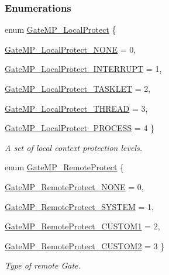 \subsubsection*{Enumerations}
\begin{DoxyCompactItemize}
\item 
enum \hyperlink{_gate_m_p_8h_a3877bd64627d7449d3687e8b06939652}{GateMP\_\-LocalProtect} \{ \par
\hyperlink{_gate_m_p_8h_a3877bd64627d7449d3687e8b06939652a4577e1162c081ed8019a349318ab3afe}{GateMP\_\-LocalProtect\_\-NONE} =  0, 
\par
\hyperlink{_gate_m_p_8h_a3877bd64627d7449d3687e8b06939652aa4c5dba40613d5436adb6c604bb8514f}{GateMP\_\-LocalProtect\_\-INTERRUPT} =  1, 
\par
\hyperlink{_gate_m_p_8h_a3877bd64627d7449d3687e8b06939652aabb3d9eb4b679ceebb537775d388f2b1}{GateMP\_\-LocalProtect\_\-TASKLET} =  2, 
\par
\hyperlink{_gate_m_p_8h_a3877bd64627d7449d3687e8b06939652a257bc8d4b8d6d19bdbe96cae37cbd908}{GateMP\_\-LocalProtect\_\-THREAD} =  3, 
\par
\hyperlink{_gate_m_p_8h_a3877bd64627d7449d3687e8b06939652aeec868d37052043812bc4c1829319a6d}{GateMP\_\-LocalProtect\_\-PROCESS} =  4
 \}
\begin{DoxyCompactList}\small\item\em A set of local context protection levels. \item\end{DoxyCompactList}\item 
enum \hyperlink{_gate_m_p_8h_a88716d5706d8fa8c6a3b9a4f023ef1d8}{GateMP\_\-RemoteProtect} \{ \par
\hyperlink{_gate_m_p_8h_a88716d5706d8fa8c6a3b9a4f023ef1d8a29b87b5258dbf5e387fc5a4ada3548ab}{GateMP\_\-RemoteProtect\_\-NONE} =  0, 
\par
\hyperlink{_gate_m_p_8h_a88716d5706d8fa8c6a3b9a4f023ef1d8aba4e153ee33cce1d32dc84254261c557}{GateMP\_\-RemoteProtect\_\-SYSTEM} =  1, 
\par
\hyperlink{_gate_m_p_8h_a88716d5706d8fa8c6a3b9a4f023ef1d8a2c1243e212dfe1dfce672b2d7556fd1d}{GateMP\_\-RemoteProtect\_\-CUSTOM1} =  2, 
\par
\hyperlink{_gate_m_p_8h_a88716d5706d8fa8c6a3b9a4f023ef1d8a997afc6350b832a6829ee004786aa8db}{GateMP\_\-RemoteProtect\_\-CUSTOM2} =  3
 \}
\begin{DoxyCompactList}\small\item\em Type of remote Gate. \item\end{DoxyCompactList}\end{DoxyCompactItemize}

